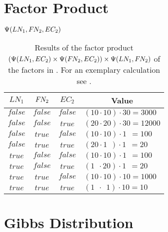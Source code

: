 \section{Factor Product}\label{app:sec-factor-product}
\begin{table}[H]
\centering
$\Psi(LN_1,F\hspace{-0.07em} N_2,EC_2)$\par
\smallskip
\begin{tabular}{c c c l}
 \toprule
 $LN_1$ & $F\hspace{-0.07em} N_2$ & $EC_2$ & \multicolumn{1}{c}{Value} \\
 \midrule
 $\mathit{false}$ & $\mathit{false}$ & $\mathit{false}$ & $(10\cdot10)\cdot30=\num{3000}$\\
 $\mathit{false}$ & $\mathit{false}$ & $\mathit{true}$  & $(20\cdot20)\cdot30=\num{12000}$\\
 $\mathit{false}$ & $\mathit{true}$  & $\mathit{false}$ & $(10\cdot10)\cdot1\ \ =100$\\
 $\mathit{false}$ & $\mathit{true}$  & $\mathit{true}$  & $(20\cdot1\ \ )\cdot1\ \ =20$\\
 $\mathit{true}$  & $\mathit{false}$ & $\mathit{false}$ & $(10\cdot10)\cdot1\ \ =100$\\
 $\mathit{true}$  & $\mathit{false}$ & $\mathit{true}$  & $(1\ \ \cdot20)\cdot1\ \ =20$\\
 $\mathit{true}$  & $\mathit{true}$  & $\mathit{false}$ & $(10\cdot10)\cdot10=\num{1000}$\\
 $\mathit{true}$  & $\mathit{true}$  & $\mathit{true}$  & $(1\ \ \cdot\ \ 1)\cdot10=10$\\
 \bottomrule
\end{tabular}
\caption{Results of the \gls{factor product} $(\Psi(LN_1,EC_2)\times\Psi(F\hspace{-0.07em} N_2,EC_2))\times\Psi(LN_1,F\hspace{-0.07em} N_2)$ of the \glspl{factor} in . For an exemplary calculation see .}
\label{tab:example-factor-product}
\end{table}
\section{Gibbs Distribution}\label{app:sec-gibbs-distribution}
